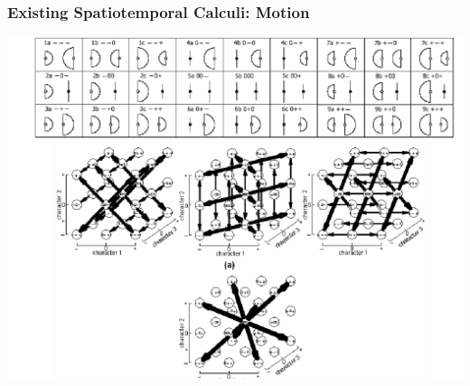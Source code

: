 \documentclass{beamer}
\begin{document}
\frame
{
  \frametitle{Existing Spatiotemporal Calculi: \alert{Motion}}
  \includegraphics[scale=0.36]{motion.png}
}
\end{document}
